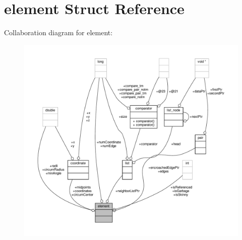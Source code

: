 \hypertarget{structelement}{\section{element Struct Reference}
\label{structelement}
}


Collaboration diagram for element\-:
\nopagebreak
\begin{figure}[H]
\begin{center}
\leavevmode
\includegraphics[width=350pt]{structelement__coll__graph}
\end{center}
\end{figure}
